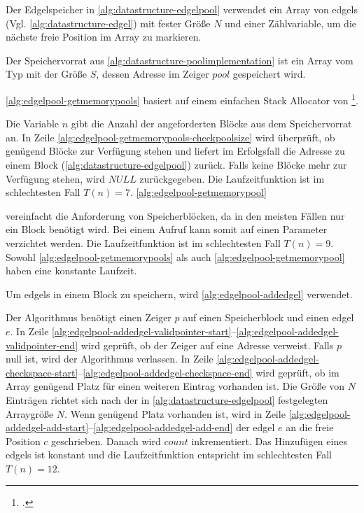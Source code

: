 Der Edgelspeicher in \autoref{alg:datastructure-edgelpool} verwendet ein Array von \glspl{edgel}
 (Vgl. \autoref{alg:datastructure-edgel}) mit fester Größe $N$ und einer Zählvariable, um die nächste freie Position im
 Array zu markieren.

Der Speichervorrat aus \autoref{alg:datastructure-poolimplementation} ist ein Array vom Typ
  mit der Größe $S$, dessen Adresse im Zeiger $\mathit{pool}$ gespeichert wird.

\autoref{alg:edgelpool-getmemorypools} basiert auf einem einfachen Stack Allocator von
 \citeauthor{kr}\footcite[Vgl.][S.~100--104]{kr}.

Die Variable $n$ gibt die Anzahl der angeforderten Blöcke aus dem Speichervorrat an. In Zeile
 \ref{alg:edgelpool-getmemorypools-checkpoolsize} wird überprüft, ob genügend Blöcke zur Verfügung stehen und liefert
 im Erfolgsfall die Adresse zu einem Block (\autoref{alg:datastructure-edgelpool}) zurück. Falls keine Blöcke mehr zur
 Verfügung stehen, wird $\mathit{NULL}$ zurückgegeben. Die Laufzeitfunktion ist im schlechtesten Fall $T(n)=7$.
 \autoref{alg:edgelpool-getmemorypool}

 vereinfacht die Anforderung von Speicherblöcken, da in den meisten Fällen nur ein Block benötigt wird. Bei einem
 Aufruf kann somit auf einen Parameter verzichtet werden. Die Laufzeitfunktion ist im schlechtesten Fall $T(n)=9$.
 Sowohl \autoref{alg:edgelpool-getmemorypools} als auch \autoref{alg:edgelpool-getmemorypool} haben eine konstante
 Laufzeit.

Um \glspl{edgel} in einem Block zu speichern, wird \autoref{alg:edgelpool-addedgel} verwendet.

Der Algorithmus benötigt einen Zeiger $p$ auf einen Speicherblock und einen \gls{edgel} $e$. In Zeile
 \ref{alg:edgelpool-addedgel-validpointer-start}--\ref{alg:edgelpool-addedgel-validpointer-end} wird geprüft, ob der
 Zeiger auf eine Adresse verweist. Falls $p$ null ist, wird der Algorithmus verlassen. In Zeile
 \ref{alg:edgelpool-addedgel-checkspace-start}--\ref{alg:edgelpool-addedgel-checkspace-end} wird geprüft, ob im Array
 genügend Platz für einen weiteren Eintrag vorhanden ist. Die Größe von $N$ Einträgen richtet sich nach der in
 \autoref{alg:datastructure-edgelpool} festgelegten Arraygröße $N$. Wenn genügend Platz vorhanden ist, wird in Zeile
 \ref{alg:edgelpool-addedgel-add-start}--\ref{alg:edgelpool-addedgel-add-end} der \gls{edgel} $e$ an die freie
 Position $c$ geschrieben. Danach wird $\mathit{count}$ inkrementiert. Das Hinzufügen eines \glspl{edgel} ist konstant
 und die Laufzeitfunktion entspricht im schlechtesten Fall $T(n) = 12$.

